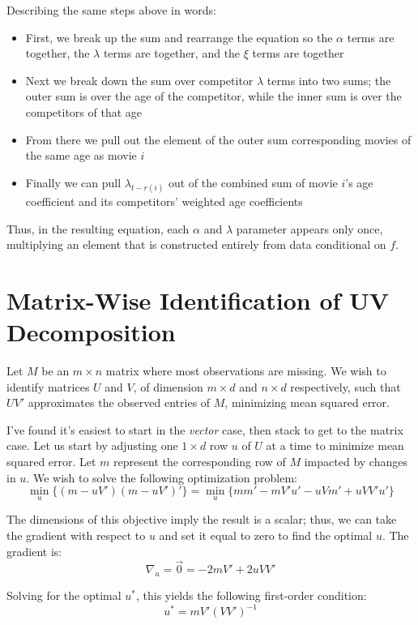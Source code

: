 \documentclass{article}
\begin{document}
\begin{appendices}
Describing the same steps above in words:
\begin{itemize}
    \item First, we break up the sum and rearrange the equation so the $\alpha$ terms are together, the $\lambda$ terms are together, and the $\xi$ terms are together
    \item Next we break down the sum over competitor $\lambda$ terms into two sums; the outer sum is over the age of the competitor, while the inner sum is over the competitors of that age
    \item From there we pull out the element of the outer sum corresponding movies of the same age as movie $i$
    \item Finally we can pull $\lambda_{t - r(i)}$ out of the combined sum of movie $i$'s age coefficient and its competitors' weighted age coefficients
\end{itemize}

Thus, in the resulting equation, each $\alpha$ and $\lambda$ parameter appears only once, multiplying an element that is constructed entirely from data conditional on $f$. 

\section{Matrix-Wise Identification of UV Decomposition}
\label{app:uv}

Let $M$ be an $m \times n$ matrix where most observations are missing. We wish to identify matrices $U$ and $V$, of dimension $m \times d$ and $n \times d$ respectively, such that $UV'$ approximates the observed entries of $M$, minimizing mean squared error. 

I've found it's easiest to start in the \emph{vector} case, then stack to get to the matrix case. Let us start by adjusting one $1 \times d$ row $u$ of $U$ at a time to minimize mean squared error. Let $m$ represent the corresponding row of $M$ impacted by changes in $u$. We wish to solve the following optimization problem:
$$\min_{u} \{ (m - uV')(m - uV')' \} = \min_{u} \{mm' - mV'u' - uVm' + uVV'u' \} $$

The dimensions of this objective imply the result is a scalar; thus, we can take the gradient with respect to $u$ and set it equal to zero to find the optimal $u$. The gradient is:
$$\nabla_u = \vec{0} = -2mV' + 2uVV'$$

Solving for the optimal $u^*$, this yields the following first-order condition:
$$u^* = mV'(VV')^{-1}$$


\end{appendices}
\end{document}

